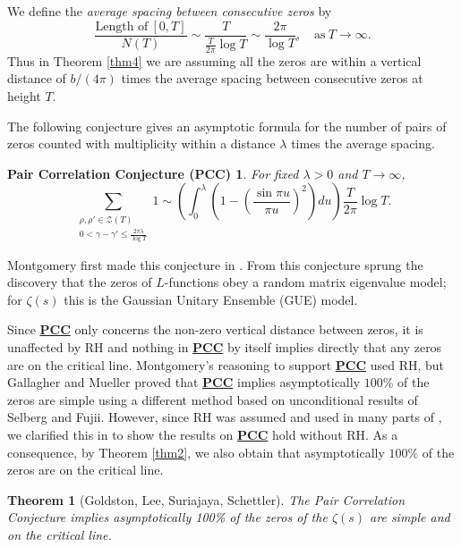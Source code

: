 \documentclass[11pt]{amsart}
\newtheorem{theorem}{Theorem}%
\theoremstyle{remark}
\theoremstyle{plain}
\newtheorem*{PCC}{Pair Correlation Conjecture (PCC)}%
\numberwithin{equation}{section}
\begin{document}
We define the {\it average spacing between consecutive zeros} by 
\begin{equation} \label{averagespacing} \frac{\text{Length of}\ [0,T]}{N(T)} \sim \frac{T}{\frac{T}{2\pi}\log{T}} \sim \frac{2\pi}{\log{T}}, \quad \text{as} \ T\to \infty. \end{equation}
Thus in Theorem \ref{thm4} we are assuming all the zeros are within a vertical distance of $b/(4\pi)$ times the average spacing between consecutive zeros at height $T$. 

The following conjecture gives an asymptotic formula for the number of pairs of zeros counted with multiplicity within a distance $\lambda$ times the average spacing.

\begin{PCC}\label{PCC} For fixed $\lambda>0$ and $T\to\infty$,
\[
\sum_{\substack{\rho,\rho' \in \mathcal{Z}(T) \\ 0< \gamma-\gamma' \le \frac{2\pi\lambda}{\log{T}}}} 1 \sim
 \left(\int_0^\lambda\left(1-\left(\frac{\sin{\pi u}}{\pi u}\right)^2\right) du \right)\frac{T}{2\pi}\log{T}.
\]
\end{PCC}
\noindent Montgomery first made this conjecture in \cite{Montgomery73}. From this conjecture sprung the discovery that the zeros of $L$-functions obey a random matrix eigenvalue model; for $\zeta(s)$ this is the Gaussian Unitary Ensemble (GUE) model.

Since \hyperref[PCC]{{\bf PCC}} only concerns the non-zero vertical distance between zeros, it is unaffected by RH and nothing in \hyperref[PCC]{{\bf PCC}} by itself implies directly that any zeros are on the critical line.
Montgomery's reasoning to support \hyperref[PCC]{{\bf PCC}} used RH, but Gallagher and Mueller \cite{GaMu78} proved that \hyperref[PCC]{{\bf PCC}} implies asymptotically $100\%$ of the zeros are simple using a different method based on unconditional results of Selberg and Fujii. 
However, since RH was assumed and used in many parts of \cite{GaMu78}, we clarified this in \cite{GLSS1} to show the results on \hyperref[PCC]{{\bf PCC}} hold without RH.
As a consequence, by Theorem \ref{thm2}, we also obtain that asymptotically $100\%$ of the zeros are on the critical line.

\begin{theorem}[Goldston, Lee, Suriajaya, Schettler] \label{thm5}
The Pair Correlation Conjecture implies
asymptotically 100\% of the zeros of the $\zeta(s)$ are simple and on the critical line.
\end{theorem}
\end{document}
